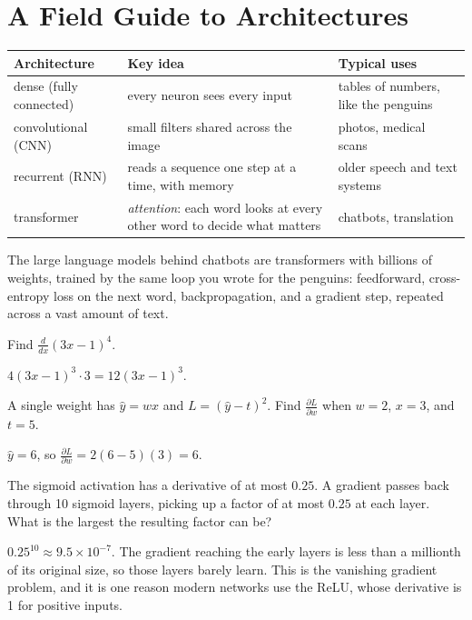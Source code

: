 \section{A Field Guide to Architectures}
\begin{center}
\begin{tabular}{l >{\raggedright\arraybackslash}p{4.4cm} >{\raggedright\arraybackslash}p{4.4cm}}
\textbf{Architecture} & \textbf{Key idea} & \textbf{Typical uses} \\
\hline
dense (fully connected) & every neuron sees every input & tables of numbers, like the penguins \\
convolutional (CNN) & small filters shared across the image & photos, medical scans \\
recurrent (RNN) & reads a sequence one step at a time, with memory & older speech and text systems \\
transformer & \emph{attention}: each word looks at every other word to decide what matters & chatbots, translation \\
\end{tabular}
\end{center}

The large language models behind chatbots are transformers with billions of weights, trained by the same loop you
wrote for the penguins: feedforward, cross-entropy loss on the next word, backpropagation, and a gradient step,
repeated across a vast amount of text.

\begin{Exercise}[label=dl1, title=Apply the chain rule]
Find $\frac{d}{dx}(3x - 1)^4$.
\end{Exercise}
\begin{Answer}[ref=dl1]
$4(3x-1)^3 \cdot 3 = 12(3x-1)^3$.
\end{Answer}

\begin{Exercise}[label=dl2, title=One gradient]
A single weight has $\hat{y} = wx$ and $L = (\hat{y} - t)^2$. Find $\frac{\partial L}{\partial w}$ when $w = 2$,
$x = 3$, and $t = 5$.
\end{Exercise}
\begin{Answer}[ref=dl2]
$\hat{y} = 6$, so $\frac{\partial L}{\partial w} = 2(6 - 5)(3) = 6$.
\end{Answer}

\begin{Exercise}[label=dl3, title=Vanishing gradients]
The sigmoid activation has a derivative of at most $0.25$. A gradient passes back through 10 sigmoid layers, picking
up a factor of at most $0.25$ at each layer. What is the largest the resulting factor can be?
\end{Exercise}
\begin{Answer}[ref=dl3]
$0.25^{10} \approx 9.5 \times 10^{-7}$. The gradient reaching the early layers is less than a millionth of its
original size, so those layers barely learn. This is the vanishing gradient problem, and it is one reason modern
networks use the ReLU, whose derivative is 1 for positive inputs.
\end{Answer}

